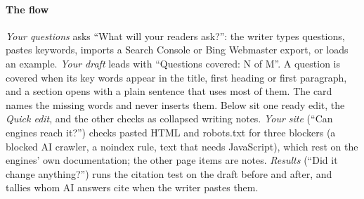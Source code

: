 \paragraph{The flow}\label{sec:flow}
\emph{Your questions} asks ``What will your readers ask?'': the writer types questions, pastes keywords, imports a Search Console or Bing Webmaster export, or loads an example.
\emph{Your draft} leads with ``Questions covered: N of M''.
A question is covered when its key words appear in the title, first heading or first paragraph, and a section opens with a plain sentence that uses most of them.
The card names the missing words and never inserts them.
Below sit one ready edit, the \emph{Quick edit}, and the other checks as collapsed writing notes.
\emph{Your site} (``Can engines reach it?'') checks pasted HTML and robots.txt for three blockers (a blocked AI crawler, a noindex rule, text that needs JavaScript), which rest on the engines' own documentation; the other page items are notes.
\emph{Results} (``Did it change anything?'') runs the citation test on the draft before and after, and tallies whom AI answers cite when the writer pastes them.


